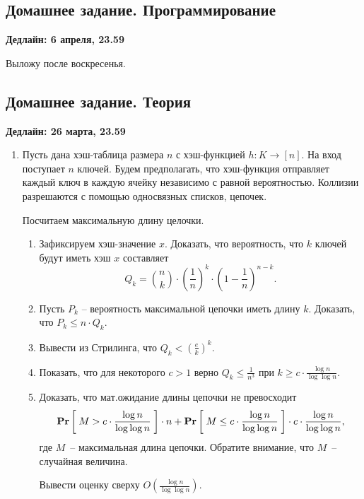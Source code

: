 \subsection{Домашнее задание. Программирование}
\textbf{Дедлайн: 6 апреля, 23.59}

Выложу после воскресенья.

\subsection{Домашнее задание. Теория}
\textbf{Дедлайн: 26 марта, 23.59}

\begin{enumerate}
  \item Пусть дана хэш-таблица размера $n$ с хэш-функцией 
$h : K \rightarrow [n]$. На вход поступает $n$ ключей. Будем предполагать, 
что хэш-функция отправляет каждый ключ в каждую ячейку независимо с равной 
вероятностью. Коллизии разрешаются с помощью односвязных списков, цепочек.
      
      Посчитаем максимальную длину целочки.
      \begin{enumerate}
          \item Зафиксируем хэш-значение $x$. Доказать, что вероятность, что 
          $k$ ключей будут иметь хэш $x$ составляет
          $$
              Q_k = \binom{n}{k} \cdot \left( \frac{1}{n} \right)^k \cdot  
              \left( 1 - \frac{1}{n} \right)^{n - k}.
          $$
          \item Пусть $P_k$ -- вероятность максимальной цепочки иметь длину $k$.
             Доказать, что $P_k \leq n \cdot Q_k$.
          \item Вывести из Стрилинга, что $Q_k < (\frac{e}{k})^k$.
          \item Показать, что для некоторого $c > 1$ верно $Q_k \leq 
            \frac{1}{n^3}$ при 
          $k \geq c \cdot \frac{\log n}{\log \log n}$.
          \item Доказать, что мат.ожидание длины цепочки не превосходит
          $$
              \underset{}{\textbf{Pr}}\left[ \;  M > c \cdot \frac{\log n}{\log \log n}  \;\right] \cdot n + 
              \underset{}{\textbf{Pr}}\left[ \;  M \leq c \cdot \frac{\log n}{\log \log n}  \;\right] \cdot c 
              \cdot \frac{\log n}{\log \log n},
          $$
          где $M$~-- максимальная длина цепочки. Обратите внимание, что $M$~--
          случайная величина.
          
          Вывести оценку сверху $O(\frac{\log n}{\log \log n})$.
      \end{enumerate}
  
\end{enumerate}

